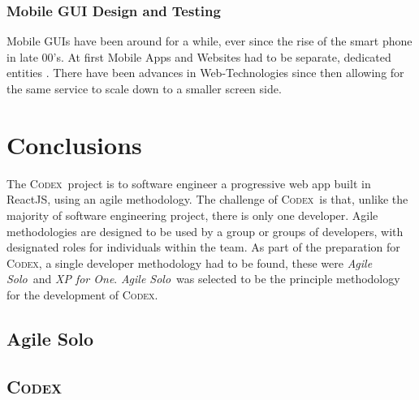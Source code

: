 \documentclass[final]{cmpreport}
\newcommand{\Codex}{\textsc{Codex}}
\newcommand{\AgileSolo}{\emph{Agile Solo}}
\begin{document}
	\subsubsection{Mobile GUI Design and Testing}
	Mobile GUIs have been around for a while, ever since the rise of the smart phone in late 00's. At first Mobile Apps and Websites had to be separate, dedicated entities \citep{MobileUsability}. There have been advances in Web-Technologies since then allowing for the same service to scale down to a smaller screen side. 
	
	\section{Conclusions} \label{sec:conclusions}
	The \Codex \ project is to software engineer a progressive web app built in ReactJS, using an agile methodology. The challenge of \Codex \ is that, unlike the majority of software engineering project, there is only one developer. Agile methodologies are designed to be used by a group or groups of developers, with designated roles for individuals within the team. As part of the preparation for \Codex, a single developer methodology had to be found, these were \AgileSolo \ and \emph{XP for One}. \AgileSolo \ was selected to be the principle methodology for the development of \Codex. 
	
		\subsection{Agile Solo} \label{sec:agile-solo-conc}
		
		
		\subsection{\Codex} \label{sec:codex-conc}
	
	\appendix
	
\end{document}
